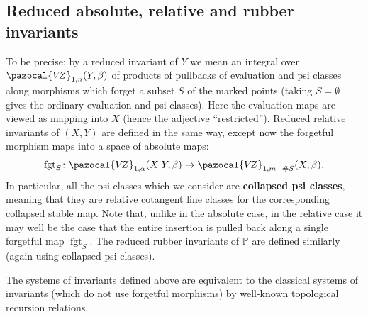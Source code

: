 \documentclass[11pt]{amsart}
\newcommand{\VZ}{\pazocal{V\!Z}}
\renewcommand{\to}{\rightarrow}
\newcommand{\fgt}{\operatorname{fgt}}
\theoremstyle{definition}
\theoremstyle{definition}
\begin{document}
\subsection{Reduced absolute, relative and rubber invariants} To be precise: by a reduced invariant of $Y$ we mean an integral over $\VZ_{1,n}(Y,\beta)$ of products of pullbacks of evaluation and psi classes along morphisms which forget a subset $S$ of the marked points (taking $S=\emptyset$ gives the ordinary evaluation and psi classes). Here the evaluation maps are viewed as mapping into $X$ (hence the adjective ``restricted''). Reduced relative invariants of $(X,Y)$ are defined in the same way, except now the forgetful morphism maps into a space of absolute maps:
\begin{equation*} \fgt_S \colon \VZ_{1,\alpha}(X|Y,\beta) \to \VZ_{1,m-\#S}(X,\beta).\end{equation*}
In particular, all the psi classes which we consider are \textbf{collapsed psi classes}, meaning that they are relative cotangent line classes for the corresponding collapsed stable map. Note that, unlike in the absolute case, in the relative case it may well be the case that the entire insertion is pulled back along a single forgetful map $\fgt_S$. The reduced rubber invariants of $\mathbb{P}$ are defined similarly (again using collapsed psi classes).

The systems of invariants defined above are equivalent to the classical systems of invariants (which do not use forgetful morphisms) by well-known topological recursion relations.
\end{document}
